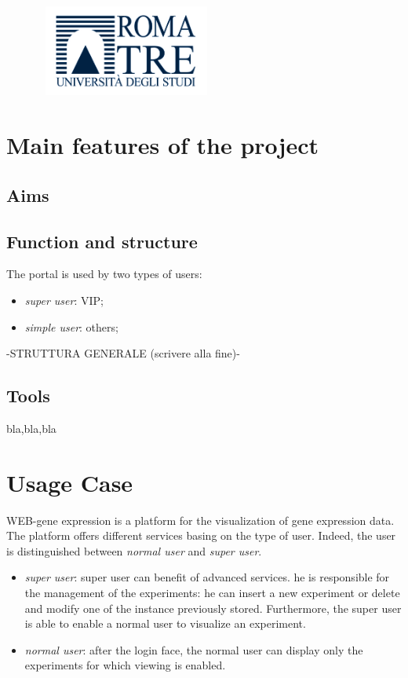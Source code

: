 \documentclass[a4paper]{report}
\begin{document}
\begin{figure}[hb]
\centering
\includegraphics[height=3cm, width=6cm]{logoRomaTre.jpg}
\end{figure}

\chapter{Main features of the project}
\section{Aims}


\section{Function and structure}
The portal is used by two types of users:
\begin{itemize}
   \item \textit{super user}: VIP;
   \item \textit{simple user}: others;
\end{itemize}

-STRUTTURA GENERALE (scrivere alla fine)-


\section{Tools}
bla,bla,bla
\chapter{Usage Case}
WEB-gene expression is a platform for the visualization of gene expression data. The platform offers different services basing on the type of user. Indeed, the user is distinguished between \emph{normal user} and \emph{super user}.
\begin{itemize}
   \item \textit{super user}: super user can benefit of advanced services. he is responsible for the management of the experiments: he can insert a new experiment or delete and modify one of the instance previously stored. Furthermore, the super user is able to enable a normal user to visualize an experiment. 
   \item \textit{normal user}: after the login face, the normal user can display only the experiments for which viewing is enabled.
\end{itemize}
\end{document}
